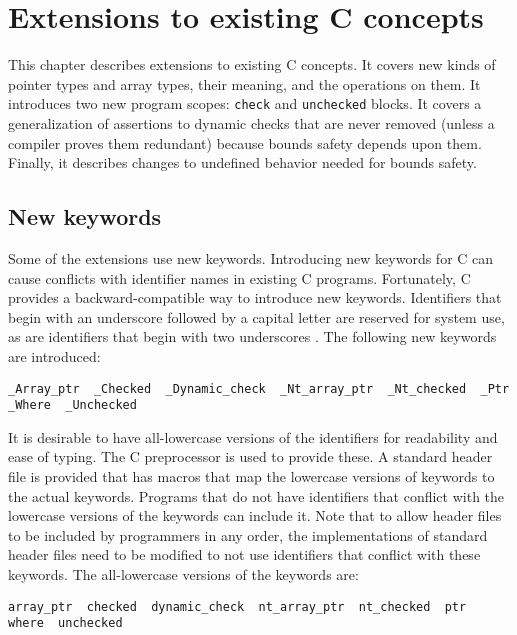 
\chapter{Extensions to existing C concepts}
\label{chapter:core-extensions}

This chapter describes extensions to existing C concepts. 
It covers new kinds of pointer types and array types, their meaning,
and the operations  on them.   It introduces two
new program scopes: \texttt{check} and \texttt{unchecked}
blocks. It covers a generalization of assertions to 
dynamic checks that are never  removed (unless a compiler
proves them redundant) because bounds safety depends upon them. 
Finally, it describes changes to
undefined behavior needed for bounds safety.

\section{New keywords}
Some of the extensions use new keywords.   Introducing new keywords
for C can cause conflicts with identifier names in existing C programs.
Fortunately, C provides a backward-compatible way to introduce new
keywords.  Identifiers that begin with an underscore followed by a
capital letter are reserved for system use, as are identifiers that
begin with two underscores \cite[Section 7.1.3]{ISO2011}. The following
new keywords are introduced:
\begin{verbatim}
_Array_ptr  _Checked  _Dynamic_check  _Nt_array_ptr  _Nt_checked  _Ptr
_Where  _Unchecked
\end{verbatim}

It is desirable to have all-lowercase versions of the
identifiers for readability and ease of typing. The C
preprocessor is used to provide these. A standard header
file  is provided that has macros
that map the lowercase versions of keywords to the actual keywords.
Programs that do not have identifiers that conflict with the
lowercase versions of the keywords can include it.
Note that to allow header files to be included by programmers in any order,
the implementations of standard header files need to be modified to
not use identifiers that conflict with these keywords.
The all-lowercase versions of the keywords are:
\begin{verbatim}
array_ptr  checked  dynamic_check  nt_array_ptr  nt_checked  ptr
where  unchecked
\end{verbatim}

